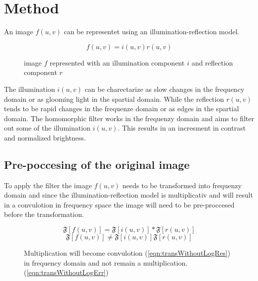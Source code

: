 \section{Method}

An image $f(u,v)$ can be representet using an illumination-reflection model. 
\begin{figure}[h!]
\begin{equation}
  f(u,v) = i(u,v) r(u,v)
  \label{eqn:im1}
\end{equation}
\caption{image $f$ represented with an illumination component $i$ and reflection component $r$}
\end{figure}
The illumination $i(u,v)$ can be charectarize as slow changes in the frequency domain or as glooming light in the spartial domain. While the reflection $r(u,v)$ tends to be rapid changes in the frequenze domain or as edges in the spartial domain. The homomorphic filter works in the frequenzy domain and aims to filter out some of the illumination $i(u,v)$. This results in an incresment in contrast and normalized brightness. \\

\subsection{Pre-poccesing of the original image}
To apply the filter the image $f(u,v)$ needs to be transformed into frequenzy domain and since the illumination-reflection model is multiplicativ and will result in a convulotion in frequency space the image will need to be pre-proccesed before the transformation.

\begin{figure}[h!]
\begin{equation}
  \mathfrak{F}[f(u,v)] = \mathfrak{F}[i(u,v)] \ast \mathfrak{F}[r(u,v)] 
  \label{eqn:transWithoutLogRes}
\end{equation}
\begin{equation}
  \mathfrak{F}[f(u,v)] \neq \mathfrak{F}[i(u,v)] \mathfrak{F}[r(u,v)] 
  \label{eqn:transWithoutLogErr}
\end{equation}
\caption{Multiplication will become convulotion (\ref{eqn:transWithoutLogRes}) in frequency domain and not remain a multiplication.(\ref{eqn:transWithoutLogErr})}
\end{figure}


